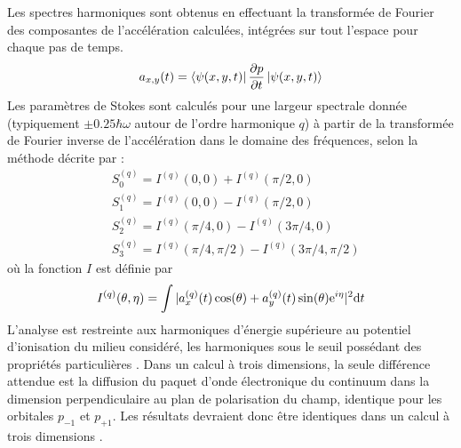 Les spectres harmoniques sont obtenus en effectuant la transformée de Fourier des composantes de l'accélération calculées, intégrées sur tout l'espace pour chaque pas de temps.
\begin{equation}
a_{x,y}(t) = \bra{\psi(x,y,t)} \frac{\partial p}{\partial t} \ket{\psi(x,y,t)}
\end{equation}
Les paramètres de Stokes sont calculés pour une largeur spectrale donnée (typiquement $\pm 0.25 \hbar \omega$ autour de l'ordre harmonique $q$) à partir de la transformée de Fourier inverse de l'accélération dans le domaine des fréquences, selon la méthode décrite par :
\begin{align}
& S_0^{(q)} = I^{(q)}(0,0) + I^{(q)}(\pi/2, 0) \label{eq:S0}\\
& S_1^{(q)} = I^{(q)}(0,0) - I^{(q)}(\pi/2,0) \\
& S_2^{(q)} = I^{(q)}(\pi/4,0) - I^{(q)}(3\pi/4,0)\\
& S_3^{(q)} = I^{(q)}(\pi/4,\pi/2) - I^{(q)}(3\pi/4,\pi/2)
\label{eq:S3}
\end{align}
où la fonction $I$ est définie par
\begin{equation}
I^{(q)}(\theta, \eta) = \int |a_x^{(q)}(t) \cos(\theta) + a_y^{(q)}(t) \sin(\theta) \mathrm{e}^{i \eta} |^2 \mathrm{d} t
\end{equation}
L'analyse est restreinte aux harmoniques d'énergie supérieure au potentiel d'ionisation du milieu considéré, les harmoniques sous le seuil possédant des propriétés particulières . Dans un calcul à trois dimensions, la seule différence attendue est la diffusion du paquet d'onde électronique du continuum dans la dimension perpendiculaire au plan de polarisation du champ, identique pour les orbitales $p_{-1}$ et $p_{+1}$. Les résultats devraient donc être identiques dans un calcul à trois dimensions .

